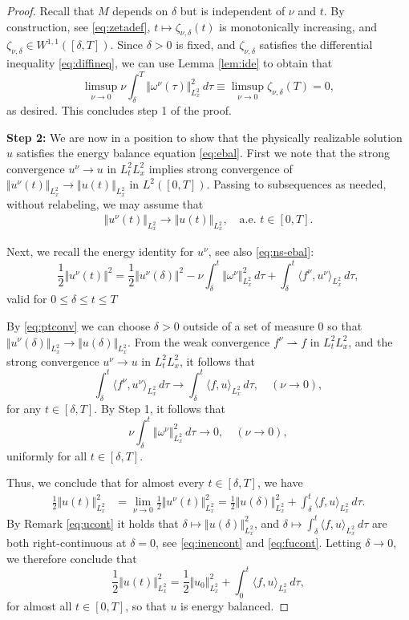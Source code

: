 \documentclass[reqno,12pt]{amsart}
\begin{document}
\begin{proof}
Recall that $M$ depends on $\delta$ but is independent of $\nu$ and $t$. By construction, see \eqref{eq:zetadef}, $t\mapsto \zeta_{\nu,\delta}(t)$ is monotonically increasing, and $\zeta_{\nu,\delta} \in W^{1,1}([\delta,T])$. Since $\delta > 0$ is fixed, and $\zeta_{\nu,\delta}$ satisfies the differential inequality \eqref{eq:diffineq}, we can use Lemma \ref{lem:ide} to obtain that
\[\limsup_{\nu \to 0} \nu \int_\delta^T \Vert \omega^\nu (\tau) \Vert^2_{L^2_x}  \, d\tau \equiv \limsup_{\nu \to 0} \zeta_{\nu,\delta}(T) = 0,\]
as desired.
This  concludes step 1 of the proof.


\textbf{Step 2:} We are now in a position to show that the physically realizable solution $u$ satisfies the energy balance equation \eqref{eq:ebal}. First we note that the strong convergence $u^\nu \to u$ in $L^2_tL^2_x$ implies strong convergence of $\Vert u^\nu(t) \Vert_{L^2_x} \to \Vert u(t) \Vert_{L^2_x}$ in $L^2([0,T])$. Passing to subsequences as needed, without relabeling, we may assume that
\begin{align}
  \label{eq:ptconv}
  \Vert u^\nu(t) \Vert_{L^2_x} \to \Vert u(t) \Vert_{L^2_x}, \quad \text{a.e. } t\in [0,T].
\end{align}

Next, we recall the energy identity for $u^\nu$, see also \eqref{eq:ns-ebal}:
\begin{equation} \label{eq:ns-ebal-delta}
\frac12 \Vert u^\nu(t) \Vert^2
=
\frac12 \Vert u^\nu(\delta) \Vert^2
-
\nu \int_\delta^t \Vert \omega^\nu \Vert^2_{L^2_x} \, d\tau
+
\int_\delta^t \langle f^\nu, u^\nu \rangle_{L^2_x} \, d\tau,
\end{equation}
valid for $0\le \delta \le t \le T$

By \eqref{eq:ptconv} we can choose $\delta > 0$ outside of a set of measure $0$ so that $\Vert u^\nu(\delta) \Vert_{L^2_x} \to \Vert u(\delta) \Vert_{L^2_x}$. From the weak convergence $f^\nu \rightharpoonup f$ in $L^2_tL^2_x$, and the strong convergence $u^\nu \to u$ in $L^2_tL^2_x$, it follows that
\[
\int_\delta^t \langle f^\nu, u^\nu \rangle_{L^2_x} \, d\tau
\to
\int_\delta^t \langle f, u \rangle_{L^2_x} \, d\tau,
\quad
(\nu \to 0),
\]
for any $t\in [\delta,T]$. By Step 1, it follows that
\[
\nu \int_\delta^t \Vert \omega^\nu \Vert^2_{L^2_x} \, d\tau
\to 0, \quad (\nu \to 0),
\]
uniformly for all $t\in [\delta,T]$.

Thus, we conclude that for almost every $t\in [\delta,T]$, we have
\begin{align*}
\frac12 \Vert u(t) \Vert^2_{L^2_x}
&=
\lim_{\nu \to 0} \frac12 \Vert u^{\nu}(t) \Vert^2_{L^2_x}
=
\frac12 \Vert u(\delta) \Vert^2_{L^2_x}
+
\int_\delta^t \langle f, u \rangle_{L^2_x} \, d\tau.
\end{align*}
By Remark \ref{eq:ucont} it holds that $\delta\mapsto \Vert u(\delta) \Vert_{L^2_x}^2$, and $\delta \mapsto \int_\delta^t \langle f, u \rangle_{L^2_x} \, d\tau$ are both right-continuous at $\delta=0$, see \eqref{eq:inencont} and \eqref{eq:fucont}. Letting $\delta \to 0$, we therefore conclude that
\[
\frac12 \Vert u(t) \Vert^2_{L^2_x}
=
\frac12 \Vert u_0 \Vert^2_{L^2_x}
+
\int_0^t \langle f, u \rangle_{L^2_x} \, d\tau,
\]
for almost all $t\in [0,T]$, so that $u$ is energy balanced.


\end{proof}
\end{document}
